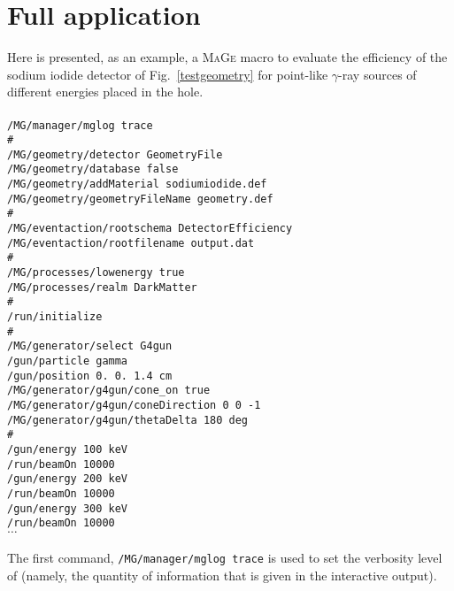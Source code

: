 \documentclass[a4paper,12pt,twoside]{article}
\begin{document}
\section{Full application} \label{themacro}
Here is presented, as an example, a \textsc{MaGe} macro to evaluate the efficiency of the 
sodium iodide detector of Fig.~\ref{testgeometry} for point-like $\gamma$-ray sources of different 
energies placed in the hole. \\
\texttt{\\
/MG/manager/mglog trace \\
\# \\
/MG/geometry/detector GeometryFile\\
/MG/geometry/database false\\
/MG/geometry/addMaterial sodiumiodide.def\\
/MG/geometry/geometryFileName geometry.def\\
\# \\
/MG/eventaction/rootschema DetectorEfficiency\\
/MG/eventaction/rootfilename output.dat\\
\# \\
/MG/processes/lowenergy true\\
/MG/processes/realm DarkMatter\\
\# \\
/run/initialize\\
\# \\
/MG/generator/select G4gun \\
/gun/particle gamma\\
/gun/position 0. 0. 1.4 cm\\
/MG/generator/g4gun/cone\_on true\\
/MG/generator/g4gun/coneDirection 0 0 -1\\
/MG/generator/g4gun/thetaDelta 180 deg\\
\# \\
/gun/energy 100 keV\\
/run/beamOn 10000\\
/gun/energy 200 keV\\
/run/beamOn 10000\\
/gun/energy 300 keV\\
/run/beamOn 10000\\
$\ldots$\\
\\}
The first command, \texttt{/MG/manager/mglog trace} is used to set the verbosity level of \mage 
(namely, the quantity of information that is given in the interactive output). \\
\end{document}

